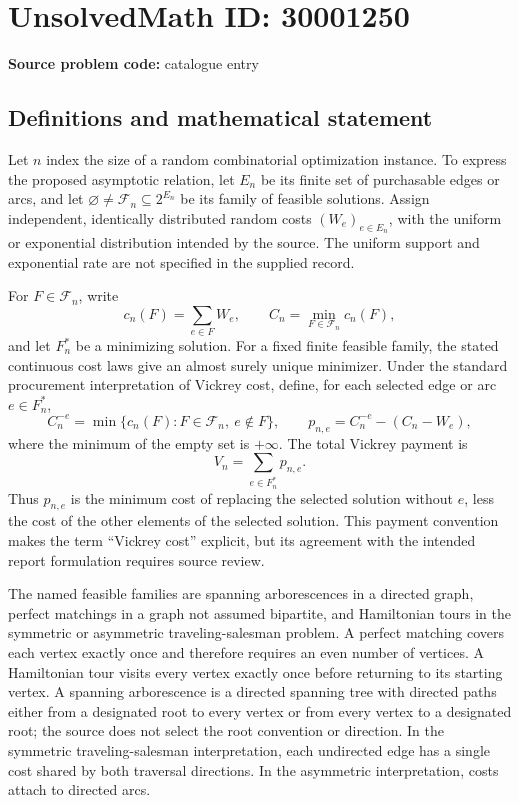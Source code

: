 \documentclass[11pt]{article}
\begin{document}
\section*{UnsolvedMath ID: 30001250}
\textbf{Source problem code:} catalogue entry
\subsection{Definitions and mathematical statement}
Let \(n\) index the size of a random combinatorial optimization instance. To express the proposed asymptotic relation, let \(E_n\) be its finite set of purchasable edges or arcs, and let \(\varnothing\ne\mathcal F_n\subseteq 2^{E_n}\) be its family of feasible solutions. Assign independent, identically distributed random costs \((W_e)_{e\in E_n}\), with the uniform or exponential distribution intended by the source. The uniform support and exponential rate are not specified in the supplied record.

For \(F\in\mathcal F_n\), write
\[
 c_n(F)=\sum_{e\in F}W_e,
 \qquad C_n=\min_{F\in\mathcal F_n}c_n(F),
\]
and let \(F_n^*\) be a minimizing solution. For a fixed finite feasible family, the stated continuous cost laws give an almost surely unique minimizer. Under the standard procurement interpretation of Vickrey cost, define, for each selected edge or arc \(e\in F_n^*\),
\[
 C_n^{-e}=\min\{c_n(F):F\in\mathcal F_n,\ e\notin F\},
 \qquad p_{n,e}=C_n^{-e}-(C_n-W_e),
\]
where the minimum of the empty set is \(+\infty\). The total Vickrey payment is
\[
 V_n=\sum_{e\in F_n^*}p_{n,e}.
\]
Thus \(p_{n,e}\) is the minimum cost of replacing the selected solution without \(e\), less the cost of the other elements of the selected solution. This payment convention makes the term ``Vickrey cost'' explicit, but its agreement with the intended report formulation requires source review.

The named feasible families are spanning arborescences in a directed graph, perfect matchings in a graph not assumed bipartite, and Hamiltonian tours in the symmetric or asymmetric traveling-salesman problem. A perfect matching covers each vertex exactly once and therefore requires an even number of vertices. A Hamiltonian tour visits every vertex exactly once before returning to its starting vertex. A spanning arborescence is a directed spanning tree with directed paths either from a designated root to every vertex or from every vertex to a designated root; the source does not select the root convention or direction. In the symmetric traveling-salesman interpretation, each undirected edge has a single cost shared by both traversal directions. In the asymmetric interpretation, costs attach to directed arcs.
\end{document}
